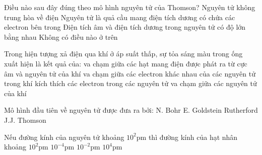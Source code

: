 \begin{ex}%
	Điều nào sau đây đúng theo mô hình nguyên tử của Thomson?
	\choice
	{%
		Nguyên tử không trung hòa về điện
	}
	{%
		\True Nguyên tử là quả cầu mang điện tích dương có chứa các electron bên trong
	}
	{%
		Điện tích âm và điện tích dương trong nguyên tử có độ lớn bằng nhau
	}
	{%
		Không có điều nào ở trên
	}
\end{ex}

\begin{ex}%
	Trong hiện tượng xả điện qua khí ở áp suất thấp, sự tỏa sáng màu trong ống xuất hiện là kết quả của:
	\choice
	{%
		\True va chạm giữa các hạt mang điện được phát ra từ cực âm và nguyên tử của khí
	}
	{%
		va chạm giữa các electron khác nhau của các nguyên tử trong khí
	}
	{%
		kích thích các electron trong các nguyên tử
	}
	{%
		va chạm giữa các nguyên tử của khí
	}
\end{ex}

\begin{ex}%
	Mô hình đầu tiên về nguyên tử được đưa ra bởi:
	\choice
	{%
		N. Bohr
	}
	{%
		E. Goldstein
	}
	{%
		Rutherford
	}
	{%
		\True J.J. Thomson
	}
\end{ex}

\begin{ex}%
	Nếu đường kính của nguyên tử khoảng $10^2 \mathrm{pm}$ thì đường kính của hạt nhân khoảng
	\choice
	{%
		$10^2 \mathrm{pm}$
	}
	{%
		$10^{-4} \mathrm{pm}$
	}
	{%
		\True	$10^{-2} \mathrm{pm}$
	}
	{
		$10^4 \mathrm{pm}$
	}
\end{ex}

